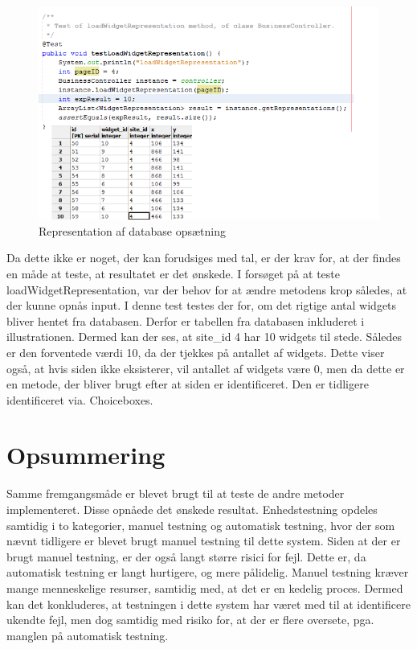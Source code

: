 \begin{figure}[ht]
  \includegraphics[width=\linewidth]{elaborationsdokumentet/figurer/test/test2.png}
  \caption{Representation af database opsætning}
  \label{fig:test-02}
\end{figure}
\FloatBarrier

Da dette ikke er noget, der kan forudsiges med tal, er der krav for, at der findes en måde at teste, at resultatet er det ønskede.  I forsøget på at teste loadWidgetRepresentation, var der behov for at ændre metodens krop således, at der kunne opnås input. I denne test testes der for, om det rigtige antal widgets bliver hentet fra databasen. Derfor er tabellen fra databasen inkluderet i illustrationen. Dermed kan der ses, at site\_id 4 har 10 widgets til stede. Således er den forventede værdi 10, da der tjekkes på antallet af widgets. Dette viser også, at hvis siden ikke eksisterer, vil antallet af widgets være 0, men da dette er en metode, der bliver brugt efter at siden er identificeret. Den er tidligere identificeret via. Choiceboxes.

\section{Opsummering}
Samme fremgangsmåde er blevet brugt til at teste de andre metoder implementeret. Disse opnåede det ønskede resultat. Enhedstestning opdeles samtidig i to kategorier, manuel testning og automatisk testning, hvor der som nævnt tidligere er blevet brugt manuel testning til dette system. Siden at der er brugt manuel testning, er der også langt større risici for fejl. Dette er, da automatisk testning er langt hurtigere, og mere pålidelig. Manuel testning kræver mange menneskelige resurser, samtidig med, at det er en kedelig proces. Dermed kan det konkluderes, at testningen i dette system har været med til at identificere ukendte fejl, men dog samtidig med risiko for, at der er flere oversete, pga. manglen på automatisk testning.



